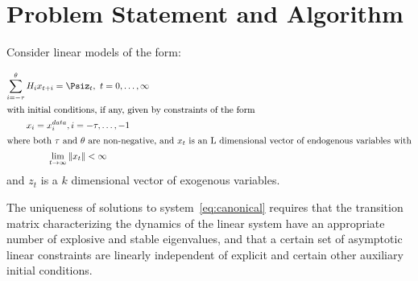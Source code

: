 \documentclass[12pt]{article}
\begin{document}
  \section{Problem Statement and Algorithm}
  

Consider linear models of the form:


\begin{gather}
\sum_{i=-\tau}^\theta{H_i x_{t+i}}= \Psi%
z_{t}, \,\, t = 0,\ldots,\infty\label{eq:canonical}\\ \intertext{with initial conditions, if any, given by constraints of the form}%
x_i  =  x^{data}_i,  i =  - \tau, \ldots, -1\label{eq:init}\\ \intertext{where both $\tau$ and $\theta$ are non-negative, and $x_t$ is an L dimensional vector 
of endogenous variables with}%
\lim_{ t \rightarrow\infty} \|x_t\|   < \infty\label{eq:limit} %
\end{gather}
{ and $z_t$ is a $k$ dimensional vector of exogenous variables.}


\label{sec:basic}

The uniqueness of solutions to 
system~\ref{eq:canonical} requires that
the transition matrix characterizing the dynamics of the 
linear system have an appropriate
number of explosive and stable eigenvalues\cite{blanchard80},
and that a certain set of  asymptotic linear constraints 
are linearly independent of explicit and certain other auxiliary initial 
conditions\cite{ANDER:AIM2}.
\end{document}
